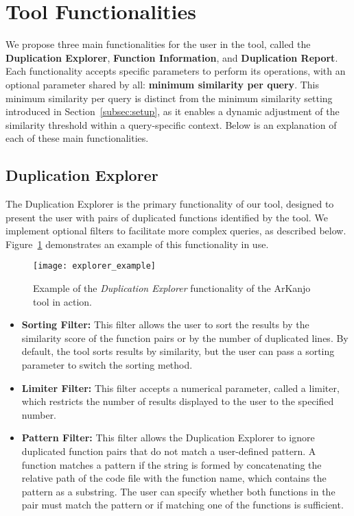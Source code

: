 \en

\section{Tool Functionalities}
\label{subsec:func}

We propose three main functionalities for the user in the tool, called the \textbf{Duplication Explorer}, \textbf{Function Information}, and \textbf{Duplication Report}. Each functionality accepts specific parameters to perform its operations, with an optional parameter shared by all: \textbf{minimum similarity per query}. This minimum similarity per query is distinct from the minimum similarity setting introduced in Section~\ref{subsec:setup}, as it enables a dynamic adjustment of the similarity threshold within a query-specific context. Below is an explanation of each of these main functionalities.

\subsection{Duplication Explorer}

The Duplication Explorer is the primary functionality of our tool, designed to present the user with pairs of duplicated functions identified by the tool. We implement optional filters to facilitate more complex queries, as described below. Figure~\ref{fig:explorer_ex} demonstrates an example of this functionality in use.

\begin{figure}[ht]
\texttt{[image: explorer\_example]}
\caption{Example of the \textit{Duplication Explorer} functionality of the ArKanjo tool in action.}
\label{fig:explorer_ex}
\end{figure}

\begin{itemize}
	\item \textbf{Sorting Filter:} This filter allows the user to sort the results by the similarity score of the function pairs or by the number of duplicated lines. By default, the tool sorts results by similarity, but the user can pass a sorting parameter to switch the sorting method.

	\item \textbf{Limiter Filter:} This filter accepts a numerical parameter, called a limiter, which restricts the number of results displayed to the user to the specified number.

	\item \textbf{Pattern Filter:} This filter allows the Duplication Explorer to ignore duplicated function pairs that do not match a user-defined pattern. A function matches a pattern if the string is formed by concatenating the relative path of the code file with the function name, which contains the pattern as a substring. The user can specify whether both functions in the pair must match the pattern or if matching one of the functions is sufficient.
\end{itemize}

